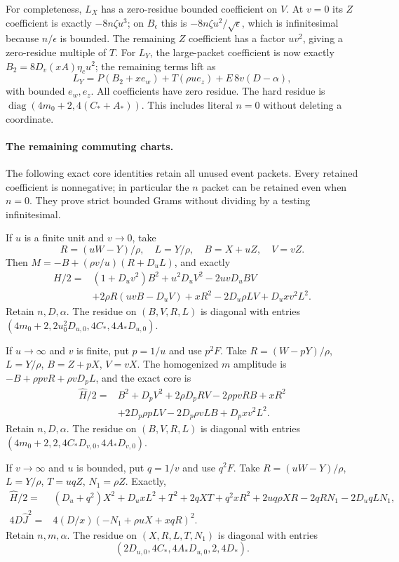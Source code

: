 For completeness, $L_X$ has a zero-residue bounded coefficient on
$V$.  At $v=0$ its $Z$ coefficient is exactly $-8n\zeta u^3$;
on $B_\epsilon$ this is $-8n\zeta u^2/\sqrt\epsilon$, which is
infinitesimal because $n/\epsilon$ is bounded.  The remaining
$Z$ coefficient has a factor $uv^2$, giving a zero-residue multiple
of $T$.  For $L_Y$, the large-packet coefficient is now exactly
$B_2=8D_v(xA)\eta_cu^2$; the remaining terms lift as
\[
 L_Y=P(B_2+xe_w)+T(\rho u e_z)+E\,8v(D-\alpha),
\]
with bounded $e_w,e_z$.  All coefficients have zero residue.  The
hard residue is $\operatorname{diag}(4m_0+2,4(C_*+A_*))$.
This includes literal $n=0$ without deleting a coordinate.

\paragraph{The remaining commuting charts.}
The following exact core identities retain all unused event packets.
Every retained coefficient is nonnegative; in particular the $n$
packet can be retained even when $n=0$.  They prove strict bounded
Grams without dividing by a testing infinitesimal.

If $u$ is a finite unit and $v\to0$, take
\[
 R=(uW-Y)/\rho,\quad L=Y/\rho,\quad B=X+uZ,\quad V=vZ.
\]
Then $M=-B+(\rho v/u)(R+D_uL)$, and exactly
\begin{align*}
 H/2={}&(1+D_uv^2)B^2+u^2D_uV^2-2uvD_uBV\\
 &+2\rho R(uvB-D_uV)+xR^2-2D_u\rho LV+D_uxv^2L^2.
\end{align*}
Retain $n,D,\alpha$.  The residue on $(B,V,R,L)$ is diagonal
with entries $(4m_0+2,2u_0^2D_{u,0},4C_*,4A_*D_{u,0})$.

If $u\to\infty$ and $v$ is finite, put $p=1/u$ and use $p^2F$.
Take $R=(W-pY)/\rho$, $L=Y/\rho$, $B=Z+pX$, $V=vX$.
The homogenized $m$ amplitude is
$-B+\rho pvR+\rho vD_pL$, and the exact core is
\begin{align*}
 \widehat H/2={}&B^2+D_pV^2+2\rho D_pRV-2\rho pvRB+xR^2\\
 &+2D_p\rho pLV-2D_p\rho vLB+D_pxv^2L^2.
\end{align*}
Retain $n,D,\alpha$.  The residue on $(B,V,R,L)$ is diagonal
with entries $(4m_0+2,2,4C_*D_{v,0},4A_*D_{v,0})$.

If $v\to\infty$ and $u$ is bounded, put $q=1/v$ and use $q^2F$.
Take $R=(uW-Y)/\rho$, $L=Y/\rho$, $T=uqZ$, $N_1=\rho Z$.
Exactly,
\begin{align*}
 \widehat H/2={}&(D_u+q^2)X^2+D_uxL^2+T^2+2qXT
       +q^2xR^2+2uq\rho XR-2qRN_1-2D_uqLN_1,\\
 4D\widehat J^2={}&4(D/x)(-N_1+\rho uX+xqR)^2.
\end{align*}
Retain $n,m,\alpha$.  The residue on $(X,R,L,T,N_1)$ is diagonal
with entries
\[ (2D_{u,0},4C_*,4A_*D_{u,0},2,4D_*). \]

